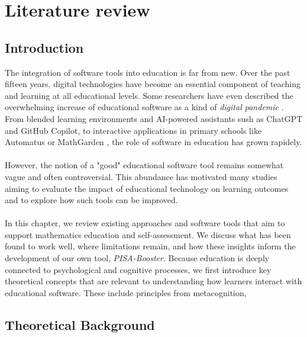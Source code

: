 \chapter{Literature review}


\section{Introduction}
The integration of software tools into education is far from new. Over the past fifteen years, digital technologies have become an essential component of teaching and learning at all educational levels.
Some researchers have even described the overwhelming increase of educational software as a kind of \textit{digital pandemic} \cite{dancsa_digital_2023}.
From blended learning environments and AI-powered assistants sush as ChatGPT and GitHub Copilot, to interactive applications in primary schools like Automatus \cite{automatus} or MathGarden \cite{rekentuin}, the role of software in education has grown rapidely. \\ \\
However, the notion of a "good" educational software tool remains somewhat vague and often controversial. 
This abundance has motivated many studies aiming to evaluate the impact of educational technology on learning outcomes and to explore how such tools can be improved. \\ \\
In this chapter, we review existing approaches and software tools that aim to support mathematics education and self-assessment. 
We discuss what has been found to work well, where limitations remain, and how these insights inform the development of our own tool, \textit{PISA-Booster}. 
Because education is deeply connected to psychological and cognitive processes, we first introduce key theoretical concepts that are relevant to understanding how learners interact with educational software.
These include principles from metacognition, 

\section{Theoretical Background}
